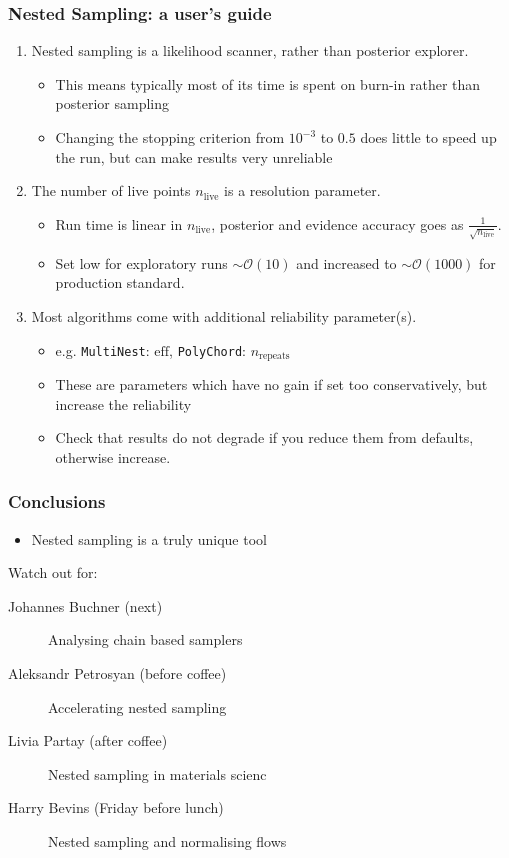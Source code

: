 \documentclass[aspectratio=169,handout]{beamer}
\begin{document}
\begin{frame}
    \frametitle{Nested Sampling: a user's guide}
    \begin{enumerate}
        \item Nested sampling is a likelihood scanner, rather than posterior explorer.
            \begin{itemize}
                \item This means typically most of its time is spent on burn-in rather than posterior sampling
                \item Changing the stopping criterion from $10^{-3}$ to $0.5$ does little to speed up the run, but can make results very unreliable
            \end{itemize}
        \item The number of live points $n_\mathrm{live}$ is a resolution parameter.
            \begin{itemize}
                \item Run time is linear in $n_\mathrm{live}$, posterior and evidence accuracy goes as $\frac{1}{\sqrt{n_\mathrm{live}}}$.
                \item Set low for exploratory runs $\sim\mathcal{O}(10)$ and increased to $\sim\mathcal{O}(1000)$ for production standard.
            \end{itemize}
        \item Most algorithms come with additional reliability parameter(s).
            \begin{itemize}
                \item e.g. \texttt{MultiNest}: $\text{eff}$, \texttt{PolyChord}: $n_\mathrm{repeats}$
                \item These are parameters which have no gain if set too conservatively, but increase the reliability
                \item Check that results do not degrade if you reduce them from defaults, otherwise increase.
            \end{itemize}
    \end{enumerate}
\end{frame}

\begin{frame}
    \frametitle{Conclusions}
    \begin{itemize}
        \item Nested sampling is a truly unique tool
    \end{itemize}
    \begin{block}{Watch out for:}
        \begin{description}
            \item[Johannes Buchner (next)] Analysing chain based samplers
            \item[Aleksandr Petrosyan (before coffee)] Accelerating nested sampling
            \item[Livia Partay (after coffee)] Nested sampling in materials scienc
            \item[Harry Bevins (Friday before lunch)] Nested sampling and normalising flows
        \end{description}
    \end{block}
\end{frame}
\end{document}
